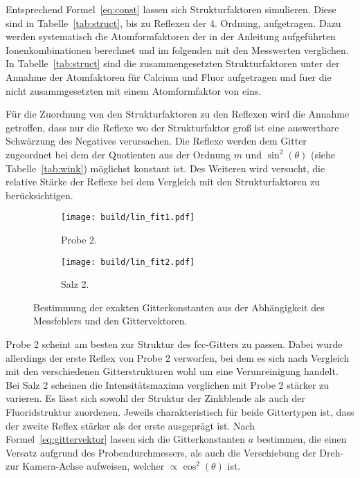 Entsprechend Formel~\eqref{eq:const} lassen sich Strukturfaktoren simulieren.
Diese sind in Tabelle~\ref{tab:struct}, bis zu Reflexen der 4. Ordnung, aufgetragen.
Dazu werden systematisch die Atomformfaktoren der in der Anleitung
\cite{anleitung} aufgeführten Ionenkombinationen berechnet und im folgenden mit
den Messwerten verglichen. 
In Tabelle~\ref{tab:struct} sind die zusammengesetzten Strukturfaktoren unter der Annahme der
Atomfaktoren für Calcium und Fluor aufgetragen und fuer die nicht
zusammgesetzten mit einem Atomformfaktor von eins.

Für die Zuordnung von den Strukturfaktoren zu den Reflexen wird die Annahme
getroffen,
dass nur die Reflexe wo der Strukturfaktor groß ist eine auswertbare Schwärzung
des Negatives verursachen. 
Die Reflexe werden dem Gitter zugeordnet bei dem der Quotienten aus der Ordnung 
$m$ und $\sin^2(\theta)$ (siehe Tabelle~\ref{tab:wink}) möglichst konstant ist.
Des Weiteren wird versucht, die relative Stärke der Reflexe bei dem Vergleich mit den
Strukturfaktoren zu berücksichtigen.

\begin{figure}[ht]
		\centering
		\begin{subfigure}{0.49\textwidth}
				\centering
				\texttt{[image: build/lin\_fit1.pdf]}
				\caption{Probe 2.}
				\label{fig:prb1}
		\end{subfigure}
		\begin{subfigure}{0.49\textwidth}
				\centering
				\texttt{[image: build/lin\_fit2.pdf]}
				\caption{Salz 2.}
				\label{fig:prb1}
		\end{subfigure}
		\caption{Bestimmung der exakten Gitterkonstanten aus der Abhängigkeit
		des	Messfehlers und den Gittervektoren.}
\end{figure}

Probe 2 scheint am besten zur Struktur des fcc-Gitters zu passen.
Dabei wurde allerdings der erste Reflex von Probe 2 verworfen, bei dem es sich
nach Vergleich mit den verschiedenen Gitterstrukturen wohl um eine Verunreinigung
handelt.
Bei Salz 2 scheinen die Intensitätsmaxima verglichen mit Probe 2 stärker zu
varieren. 
Es lässt sich sowohl der Struktur der Zinkblende als auch der Fluoridstruktur
zuordenen. 
Jeweils charakteristisch für beide Gittertypen ist, dass der zweite Reflex
stärker als der erste ausgeprägt ist.
Nach Formel~\eqref{eq:gittervektor} lassen sich die
Gitterkonstanten $a$ bestimmen, die einen Versatz aufgrund des
Probendurchmessers, als auch die Verschiebung der Dreh- zur Kamera-Achse
aufweisen, welcher $\propto \cos^2(\theta)$ ist.

